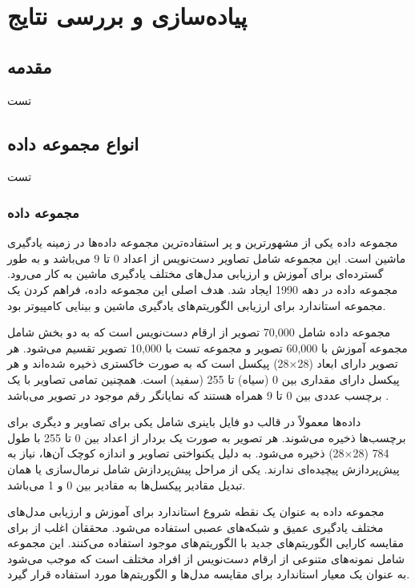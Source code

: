 \chapter{پیاده‌سازی و بررسی نتایج}

\section{مقدمه}
تست


\section{انواع مجموعه داده}
تست

\subsection{
مجموعه داده
}
مجموعه داده
یکی از مشهورترین و پر استفاده‌ترین مجموعه داده‌ها در زمینه یادگیری ماشین است. این مجموعه شامل تصاویر دست‌نویس از اعداد 0 تا 9 می‌باشد و به طور گسترده‌ای برای آموزش و ارزیابی مدل‌های مختلف یادگیری ماشین به کار می‌رود.
مجموعه داده
در دهه 1990 ایجاد شد. هدف اصلی این مجموعه داده، فراهم کردن یک مجموعه استاندارد برای ارزیابی الگوریتم‌های یادگیری ماشین و بینایی کامپیوتر بود.

مجموعه داده
شامل 70,000 تصویر از ارقام دست‌نویس است که به دو بخش شامل مجموعه آموزش با 60,000 تصویر و مجموعه تست با 10,000 تصویر تقسیم می‌شود. هر تصویر دارای ابعاد
(28$\times$28)
پیکسل است که به صورت خاکستری%
ذخیره شده‌اند و هر پیکسل دارای مقداری بین 0 (سیاه) تا 255 (سفید) است. همچنین تمامی تصاویر با یک برچسب عددی بین 0 تا 9 همراه هستند که نمایانگر رقم موجود در تصویر می‌باشد
\cite{lecun1998gradient}.

داده‌ها معمولاً در قالب دو فایل باینری شامل یکی برای تصاویر و دیگری برای برچسب‌ها ذخیره می‌شوند. هر تصویر به صورت یک بردار از اعداد بین 0 تا 255 با طول 784
(28$\times$28)
ذخیره می‌شود. به دلیل یکنواختی تصاویر و اندازه کوچک آن‌ها، نیاز به پیش‌پردازش پیچیده‌ای ندارند. یکی از مراحل پیش‌پردازش شامل نرمال‌سازی یا همان تبدیل مقادیر پیکسل‌ها به مقادیر بین 0 و 1 می‌باشد.

مجموعه داده
به عنوان یک نقطه شروع استاندارد برای آموزش و ارزیابی مدل‌های مختلف یادگیری عمیق و شبکه‌های عصبی استفاده می‌شود. محققان اغلب از
برای مقایسه کارایی الگوریتم‌های جدید با الگوریتم‌های موجود استفاده می‌کنند. این مجموعه شامل نمونه‌های متنوعی از ارقام دست‌نویس از افراد مختلف است که موجب می‌شود به عنوان یک معیار استاندارد برای مقایسه مدل‌ها و الگوریتم‌ها مورد استفاده قرار گیرد.

